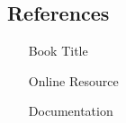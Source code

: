 \documentclass{article}
\begin{document}
\subsection{References}
    \begin{itemize}
        \item [Book Title]
        \item [Online Resource]
        \item [Documentation]
    \end{itemize}
    
\end{document}
